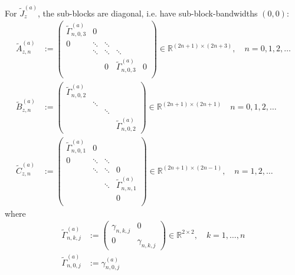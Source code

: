\documentclass[11pt, oneside]{article}   	%
\newcommand{\R}{\mathbb{R}}
\newcommand{\gammaa}{\gamma^{(a)}}
\begin{document}
For $\tilde J_z^{(a)}$, the sub-blocks are diagonal, i.e. have sub-block-bandwidths $(0,0)$:
\begin{align*}
	\tilde A^{(a)}_{z,n} &:= 
		\begin{pmatrix}
			\tilde \Gamma^{(a)}_{n,0,3} & 0 & \\
			0 & \ddots & \ddots & & \\
			& \ddots & \ddots & \ddots & \\
			& & 0 & \tilde \Gamma^{(a)}_{n,0,3} & 0 \\
		\end{pmatrix} \in \R^{(2n+1)\times(2n+3)}, \quad n = 0,1,2,\dots \\
	\tilde B^{(a)}_{z,n} &:= 
		\begin{pmatrix}
			\tilde \Gamma^{(a)}_{n,0,2} & \\
			& \ddots & & \\
			& & \ddots & \\
			& & & \tilde \Gamma^{(a)}_{n,0,2}
		\end{pmatrix} \in \R^{(2n+1)\times(2n+1)}  \quad n = 0,1,2,\dots \\
	\tilde C^{(a)}_{z,n} &:= 
		\begin{pmatrix}
			\tilde \Gamma^{(a)}_{n,0,1} & 0 & & \\
			0 & \ddots & \ddots & \\
			& \ddots & \ddots & 0 \\
			& & \ddots & \tilde \Gamma^{(a)}_{n,n,1} \\
			& & & 0 \\
		\end{pmatrix} \in \R^{(2n+1)\times(2n-1)}, \quad n = 1,2,\dots
\end{align*}
where
\begin{align*}
	\tilde \Gamma^{(a)}_{n,k,j} &:= 
		\begin{pmatrix}
			\gamma_{n,k,j} & 0 \\
			0 & \gamma_{n,k,j}
		\end{pmatrix} \in \R^{2\times2}, \quad k = 1,\dots,n \\
	\tilde \Gamma^{(a)}_{n,0,j} &:= \gammaa_{n,0,j}
\end{align*}
\end{document}

